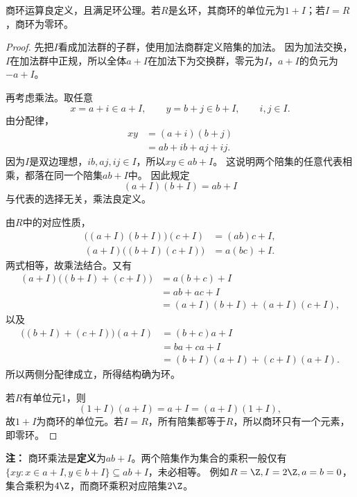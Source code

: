 \begin{proposition}
\label{p2:concept:c1-l1261}商环运算良定义，且满足环公理。若$R$是幺环，其商环的单位元为$1+I$；若$I=R$，商环为零环。
\end{proposition}
\begin{proof}
先把$I$看成加法群的子群，使用加法商群定义陪集的加法。
因为加法交换，$I$在加法群中正规，所以全体$a+I$在加法下为交换群，零元为$I$，$a+I$的负元为$-a+I$。

再考虑乘法。取任意
\[
x=a+i\in a+I,\qquad y=b+j\in b+I,
\qquad i,j\in I.
\]
由分配律，
\[
\begin{aligned}
xy
&=(a+i)(b+j)\\
&=ab+ib+aj+ij.
\end{aligned}
\]
因为$I$是双边理想，$ib,aj,ij\in I$，所以$xy\in ab+I$。
这说明两个陪集的任意代表相乘，都落在同一个陪集$ab+I$中。
因此规定
\[
(a+I)(b+I)=ab+I
\]
与代表的选择无关，乘法良定义。

由$R$中的对应性质，
\[
\begin{aligned}
\bigl((a+I)(b+I)\bigr)(c+I)&=(ab)c+I,\\
(a+I)\bigl((b+I)(c+I)\bigr)&=a(bc)+I.
\end{aligned}
\]
两式相等，故乘法结合。又有
\[
\begin{aligned}
(a+I)\bigl((b+I)+(c+I)\bigr)
&=a(b+c)+I\\
&=ab+ac+I\\
&=(a+I)(b+I)+(a+I)(c+I),
\end{aligned}
\]
以及
\[
\begin{aligned}
\bigl((b+I)+(c+I)\bigr)(a+I)
&=(b+c)a+I\\
&=ba+ca+I\\
&=(b+I)(a+I)+(c+I)(a+I).
\end{aligned}
\]
所以两侧分配律成立，所得结构确为环。

若$R$有单位元1，则
\[
(1+I)(a+I)=a+I=(a+I)(1+I),
\]
故$1+I$为商环的单位元。若$I=R$，所有陪集都等于$R$，所以商环只有一个元素，即零环。
\end{proof}

\textbf{注：}
商环乘法是\textbf{定义}为$ab+I$。两个陪集作为集合的乘积一般仅有
$\{xy:x\in a+I,y\in b+I\}\subseteq ab+I$，未必相等。
例如$R=\Z,I=2\Z,a=b=0$，集合乘积为$4\Z$，而商环乘积对应陪集$2\Z$。

